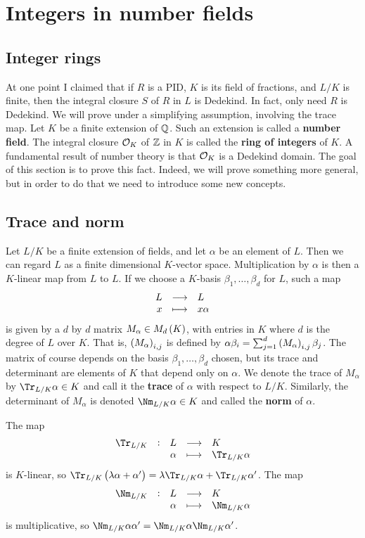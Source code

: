 \pagebreak

\section{Integers in number fields}

\subsection{Integer rings}

At one point I claimed that if $ R $ is a PID, $ K $ is its field of fractions, and $ L / K $ is finite, then the integral closure $ S $ of $ R $ in $ L $ is Dedekind. In fact, only need $ R $ is Dedekind. We will prove under a simplifying assumption, involving the trace map. Let $ K $ be a finite extension of $ \mathbb{Q} $. Such an extension is called a \textbf{number field}. The integral closure $ \mathcal{O}_K $ of $ \mathbb{Z} $ in $ K $ is called the \textbf{ring of integers} of $ K $. A fundamental result of number theory is that $ \mathcal{O}_K $ is a Dedekind domain. The goal of this section is to prove this fact. Indeed, we will prove something more general, but in order to do that we need to introduce some new concepts.

\subsection{Trace and norm}

Let $ L / K $ be a finite extension of fields, and let $ \alpha $ be an element of $ L $. Then we can regard $ L $ as a finite dimensional $ K $-vector space. Multiplication by $ \alpha $ is then a $ K $-linear map from $ L $ to $ L $. If we choose a $ K $-basis $ \beta_1, \dots, \beta_d $ for $ L $, such a map
$$ \function{L}{L}{x}{x\alpha} $$
is given by a $ d $ by $ d $ matrix $ M_\alpha \in M_d\br{K} $, with entries in $ K $ where $ d $ is the degree of $ L $ over $ K $. That is, $ \br{M_\alpha}_{i, j} $ is defined by $ \alpha\beta_i = \sum_{j = 1}^d \br{M_\alpha}_{i, j}\beta_j $. The matrix of course depends on the basis $ \beta_1, \dots, \beta_d $ chosen, but its trace and determinant are elements of $ K $ that depend only on $ \alpha $. We denote the trace of $ M_\alpha $ by $ \Tr_{L / K} \alpha \in K $ and call it the \textbf{trace} of $ \alpha $ with respect to $ L / K $. Similarly, the determinant of $ M_\alpha $ is denoted $ \Nm_{L / K} \alpha \in K $ and called the \textbf{norm} of $ \alpha $.

\begin{lemma}
The map
$$ \function[\Tr_{L / K}]{L}{K}{\alpha}{\Tr_{L / K} \alpha} $$
is $ K $-linear, so $ \Tr_{L / K} \br{\lambda\alpha + \alpha'} = \lambda \Tr_{L / K} \alpha + \Tr_{L / K} \alpha' $. The map
$$ \function[\Nm_{L / K}]{L}{K}{\alpha}{\Nm_{L / K} \alpha} $$
is multiplicative, so $ \Nm_{L / K} \alpha\alpha' = \Nm_{L / K} \alpha\Nm_{L / K} \alpha' $.
\end{lemma}

